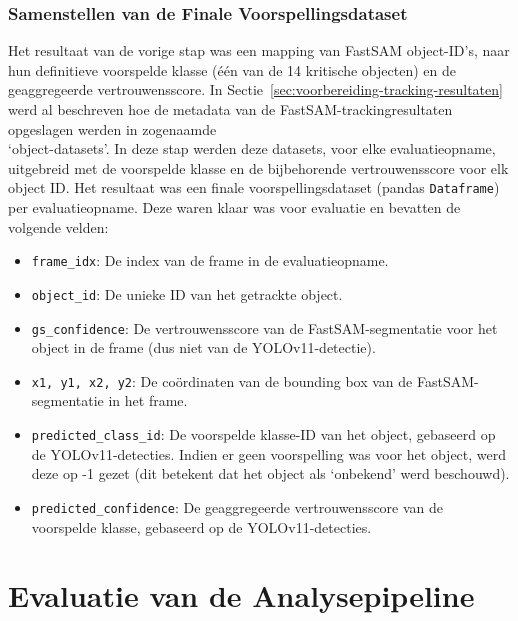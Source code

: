 \subsubsection{Samenstellen van de Finale Voorspellingsdataset}
Het resultaat van de vorige stap was een mapping van FastSAM object-ID's, 
naar hun definitieve voorspelde klasse (één van de 14 kritische objecten) 
en de geaggregeerde vertrouwensscore.
In Sectie~\ref{sec:voorbereiding-tracking-resultaten} werd al beschreven hoe de metadata van de FastSAM-trackingresultaten opgeslagen werden in zogenaamde\\ `object-datasets'.
In deze stap werden deze datasets, voor elke evaluatieopname, uitgebreid met de voorspelde klasse en de bijbehorende vertrouwensscore voor elk object ID.
Het resultaat was een finale voorspellingsdataset (pandas \texttt{Dataframe}) per evaluatieopname. Deze waren klaar was voor evaluatie en bevatten de volgende velden:
\begin{itemize}
    \item \texttt{frame\_idx}: De index van de frame in de evaluatieopname.
    \item \texttt{object\_id}: De unieke ID van het getrackte object.
    \item \texttt{gs\_confidence}: De vertrouwensscore van de FastSAM-segmentatie voor het object in de frame (dus niet van de YOLOv11-detectie).
    \item \texttt{x1, y1, x2, y2}: De coördinaten van de bounding box van de FastSAM-segmentatie in het frame.
    \item \texttt{predicted\_class\_id}: De voorspelde klasse-ID van het object, gebaseerd op de YOLOv11-detecties.
    Indien er geen voorspelling was voor het object, werd deze op -1 gezet (dit betekent dat het object als `onbekend' werd beschouwd).
    \item \texttt{predicted\_confidence}: De geaggregeerde vertrouwensscore van de voorspelde klasse, gebaseerd op de YOLOv11-detecties.
\end{itemize}

\section{Evaluatie van de Analysepipeline}

